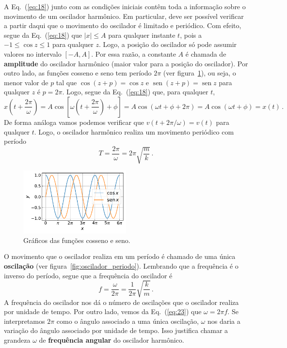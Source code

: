 \documentclass[12pt,a4paper]{article}
\newcommand{\dpar}[1]{\left(#1\right)}
\newcommand{\dsqr}[1]{\left[#1\right]}
\theoremstyle{definition}
\DeclareMathOperator{\sen}{sen}
\begin{document}
A Eq.~(\ref{eq:18}) junto com as condições iniciais contêm toda a
informação sobre o movimento de um oscilador harmônico. Em particular,
deve ser possível verificar a partir daqui que o movimento do
oscilador é limitado e periódico. Com efeito, segue da
Eq.~(\ref{eq:18}) que $|x|\le A$ para qualquer instante $t$, pois a
$-1\le \cos z\le 1$ para qualquer $z$. Logo, a posição do oscilador só
pode assumir valores no intervalo $[-A,A]$. Por essa razão, a
constante $A$ é chamada de \textbf{amplitude} do oscilador harmônico
(maior valor para a posição do oscilador). Por outro lado, as funções
cosseno e seno tem período $2\pi$ (ver figura~\ref{fig:senocosseno}),
ou seja, o menor valor de $p$ tal que $\cos(z+p)=\cos z$ e
$\sen(z+p)=\sen z$ para qualquer $z$ é $p=2\pi$. Logo, segue da
Eq.~(\ref{eq:18}) que, para qualquer $t$,
$$x\dpar{t+\frac{2\pi}{\omega}}=A\cos\dsqr{\omega\dpar{t+\frac{2\pi}{\omega}}+\phi}=A\cos(\omega t+\phi+2\pi)=A\cos(\omega t+\phi)=x(t)\,.$$
De forma análoga vamos podemos verificar que $v(t+2\pi/\omega)=v(t)$
para qualquer $t$. Logo, o oscilador harmônico realiza um movimento
periódico com período
\begin{equation}
  \label{eq:22}
  T=\frac{2\pi}{\omega}=2\pi\sqrt{\frac{m}{k}}\,.
\end{equation}
\begin{figure}[t]
  \centering
  \includegraphics[width=0.5\textwidth,keepaspectratio]{aux/senocosseno.pdf}
  \caption{Gráficos das funções cosseno e seno.}
  \label{fig:senocosseno}
\end{figure}

O movimento que o oscilador realiza em um período é chamado de uma
única \textbf{oscilação} (ver
figura~\ref{fig:oscilador_periodo}). Lembrando que a frequência é o
inverso do período, segue que a frequência do oscilador é
\begin{equation}
  \label{eq:23}
  f=\frac{\omega}{2\pi}=\frac{1}{2\pi}\sqrt{\frac{k}{m}}\,.
\end{equation}
A frequência do oscilador nos dá o número de oscilações que o
oscilador realiza por unidade de tempo. Por outro lado, vemos da
Eq.~(\ref{eq:23}) que $\omega=2\pi f$. Se interpretamos $2\pi$ como o
ângulo associado a uma única oscilação, $\omega$ nos daria a variação
do ângulo associado por unidade de tempo. Isso justifica chamar a
grandeza $\omega$ de \textbf{frequência angular} do oscilador
harmônico.
\end{document}
